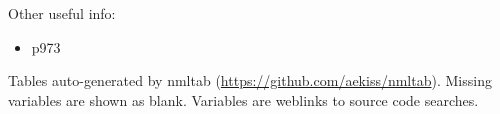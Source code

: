 \documentclass[10pt]{article}
\newcommand{\nmllink}[2]{#1} %
\newcommand{\nml}[1]{{\footnotesize\textsf{}}}
\newcommand{\doscript}[1]{{\footnotesize\textsf{}}}
\begin{document}
Other useful info:
\begin{itemize}
\item \citet{GriffiesWintonAndersonBensonDelworthDufourDunneGoddardMorrison2015a} p973
\end{itemize}

\renewcommand{\nmllink}[2]{\href{https://github.com/mom-ocean/MOM5/search?q=#2}{#1}} %
Tables auto-generated by nmltab (\url{https://github.com/aekiss/nmltab}).
Missing variables are shown as blank. Variables are \textcolor{link}{weblinks} to source code searches.






\tableofcontents

%
%
\end{document}
